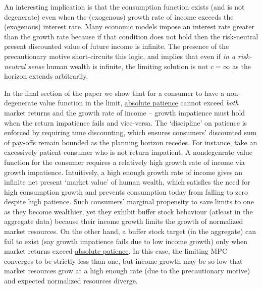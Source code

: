 \documentclass[BufferStockTheory]{subfiles}
\begin{document}
% 

\begin{comment}
  The benchmark `well-behaved' consumer satisfies both growth impatience and return impatience. At the same time neither return impatience nor growth impatience are necessary for a non-degenerate limiting solution. However, i
\end{comment}

An interesting implication is that the consumption function exists (and is not degenerate) even when the (exogenous) growth rate of income exceeds the (exogenous) interest rate.  Many economic models impose an interest rate greater than the growth rate because if that condition does not hold then the risk-neutral present discounted value of future income is infinite.  The presence of the precautionary motive short-circuits this logic, and implies that even if \textit{in a risk-neutral sense} human wealth is infinite, the limiting solution is not $c = \infty$ as the horizon extends arbitrarily.

In the final section of the paper we show that for a consumer to have a non-degenerate value function in the limit, \hyperlink{APF}{absolute patience} cannot exceed \textit{both} market returns and the growth rate of income -- growth impatience must hold when the return impatience fails and vice-versa. The `discipline' on patience is enforced by requiring time discounting, which ensures consumers' discounted sum of pay-offs remain bounded as the planning horizon recedes. For instance, take an excessively patient consumer who is not return impatient. A nondegenrate value function for the consumer requires a relatively high growth rate of income via growth impatience. Intuitively, a high enough growth rate of income gives an infinite net present `market value' of human wealth, which satisfies the need for high consumption growth and prevents consumption today from falling to zero despite high patience. Such consumers' marginal propensity to save limits to one as they become wealthier, yet they exhibit buffer stock behaviour (atleast in the aggregate data) because their income growth limits the growth of normalized market resources. On the other hand, a buffer stock target (in the aggregate) can fail to exist  (say growth impatience fails due to low income growth) only when market returns exceed \hyperlink{APF}{absolute patience}. In this case, the limiting MPC converges to be strictly less than one, but income growth may be so low that market resources grow at a high enough rate (due to the precautionary motive) and expected normalized resources diverge.  
\end{document}
